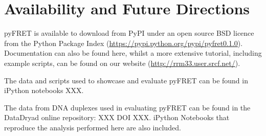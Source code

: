 \section{Availability and Future Directions}
\label{sect:availability}
pyFRET is available to download from PyPI under an open source BSD licence from the Python Package Index (\url{https://pypi.python.org/pypi/pyfret0.1.0}). Documentation can also be found here, whilst a more extensive tutorial, including example scripts, can be found on our website (\url{http://rrm33.user.srcf.net/}).

The data and scripts used to showcase and evaluate pyFRET can be found in iPython notebooks XXX.


The data from DNA duplexes used in evaluating pyFRET can be found in the DataDryad online repository: XXX DOI XXX. iPython Notebooks that reproduce the analysis performed here are also included.









